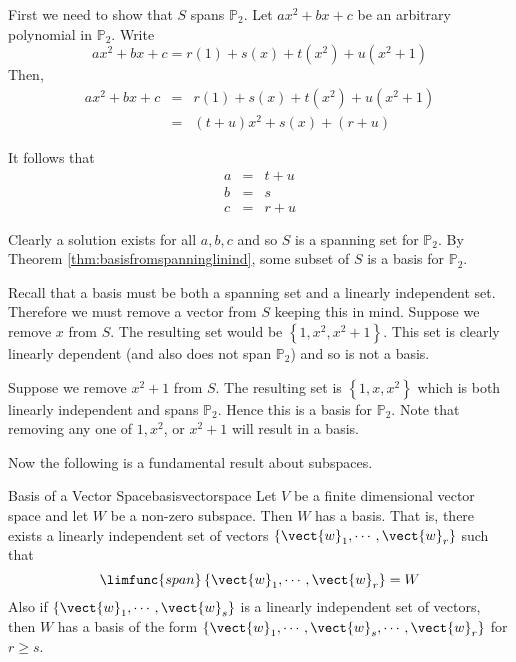 \begin{solution}
First we need to show that $S$ spans $\mathbb{P}_2$. Let $ax^2 + bx + c$ be an arbitrary polynomial in $\mathbb{P}_2$. Write 
\[
ax^2 + bx + c = r(1) + s(x) + t(x^2) + u (x^2 + 1)
\]
Then,
\begin{eqnarray*}
ax^2 +bx + c &=& r(1) + s(x) + t(x^2) + u (x^2 + 1) \\
&=& (t+u) x^2 + s(x) + (r+u) 
\end{eqnarray*}

It follows that 
\begin{eqnarray*}
a &=& t + u \\
b &=& s \\
c &=& r + u 
\end{eqnarray*}

Clearly a solution exists for all $a,b,c$ and so $S$ is a spanning set for $\mathbb{P}_2$. By Theorem \ref{thm:basisfromspanninglinind}, some subset of $S$ is a basis for $\mathbb{P}_2$. 

Recall that a basis must be both a spanning set and a linearly independent set.
Therefore we must remove a vector from $S$ keeping this in mind. Suppose we remove $x$ from $S$. The resulting set would be $\left\{ 1, x^2, x^2 + 1 \right\}$. This set is clearly linearly dependent (and also does not span $\mathbb{P}_2$) and so is not a basis. 

Suppose we remove $x^2 + 1$ from $S$. The resulting set is $\left\{ 1, x, x^2 \right\}$ which is both linearly independent and spans $\mathbb{P}_2$. Hence this is a basis for $\mathbb{P}_2$. Note that removing any one of $1, x^2$, or $x^2 + 1$ will result in a basis.
\end{solution}

Now the following is a fundamental result about subspaces.

\begin{theorem}{Basis of a Vector Space}{basisvectorspace}
Let $V$ be a finite dimensional vector space and let $W$ be
a non-zero subspace. Then $W$ has a basis. That is, there exists a linearly
independent set of vectors $\left\{ \vect{w}_{1},\cdots ,\vect{w}_{r}\right\} $
such that 
\begin{equation*}
\limfunc{span}\left\{ \vect{w}_{1},\cdots ,\vect{w}_{r}\right\} =W
\end{equation*}
Also if $\left\{ \vect{w}_{1},\cdots ,\vect{w}_{s}\right\} $ is a linearly
independent set of vectors, then $W$ has a basis of the form $\left\{ \vect{w}
_{1},\cdots ,\vect{w}_{s},\cdots ,\vect{w}_{r}\right\} $ for $r\geq s$.
\end{theorem}

